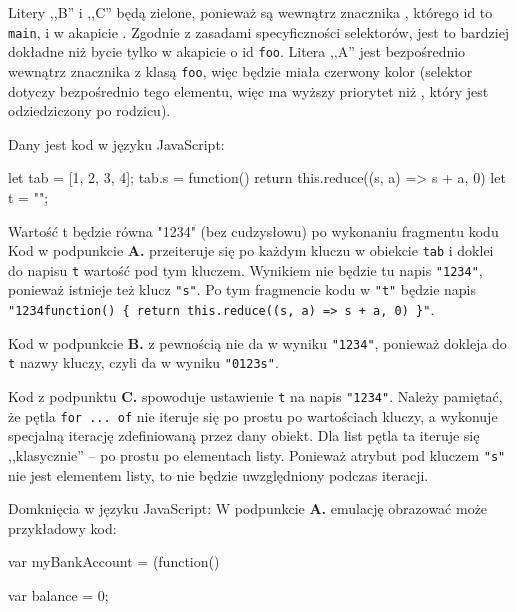 \begin{solutions}
    Litery ,,B'' i ,,C'' będą zielone, ponieważ są wewnątrz znacznika , którego id to \texttt{main}, i w akapicie . Zgodnie z zasadami specyficzności selektorów, jest to bardziej dokładne niż bycie tylko w akapicie o id \texttt{foo}. Litera ,,A'' jest bezpośrednio wewnątrz znacznika  z klasą \texttt{foo}, więc będzie miała czerwony kolor (selektor  dotyczy bezpośrednio tego elementu, więc ma wyższy priorytet niż , który jest odziedziczony po rodzicu).

    \sol Dany jest kod w języku JavaScript:
    \begin{js}
        let tab = [1, 2, 3, 4];
        tab.s = function() { return this.reduce((s, a) => s + a, 0) }
        let t = "";
    \end{js}
    Wartość t będzie równa "1234" (bez cudzysłowu) po wykonaniu fragmentu kodu
    Kod w podpunkcie \textbf{A.} przeiteruje się po każdym kluczu w obiekcie \texttt{tab} i doklei do napisu \texttt{t} wartość pod tym kluczem. Wynikiem nie będzie tu napis \texttt{"1234"}, ponieważ istnieje też klucz \texttt{"s"}. Po tym fragmencie kodu w \texttt{"t"} będzie napis \texttt{"1234function() \{ return this.reduce((s, a) => s + a, 0) \}"}.
    
    Kod w podpunkcie \textbf{B.} z pewnością nie da w wyniku \texttt{"1234"}, ponieważ dokleja do \texttt{t} nazwy kluczy, czyli da w wyniku \texttt{"0123s"}.
    
    Kod z podpunktu \textbf{C.} spowoduje ustawienie \texttt{t} na napis \texttt{"1234"}. Należy pamiętać, że pętla \texttt{for ... of} nie iteruje się po prostu po wartościach kluczy, a wykonuje specjalną iterację zdefiniowaną przez dany obiekt. Dla list pętla ta iteruje się ,,klasycznie'' -- po prostu po elementach listy. Ponieważ atrybut pod kluczem \texttt{"s"} nie jest elementem listy, to nie będzie uwzględniony podczas iteracji.

    \sol Domknięcia w języku JavaScript:
    W podpunkcie \textbf{A.} emulację obrazować może przykładowy kod:
    \begin{js}
        var myBankAccount = (function(){
          var balance = 0;
        
}
\end{js}
\end{solutions}
